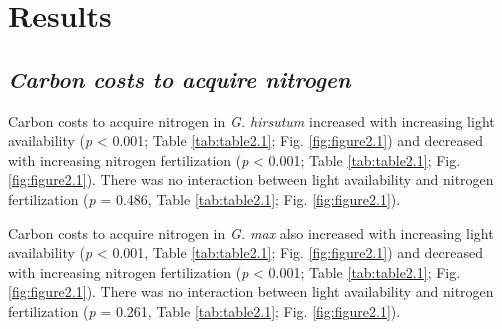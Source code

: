 \section{Results}
\subsection{\textit{Carbon costs to acquire nitrogen}}
Carbon costs to acquire nitrogen in \textit{G. hirsutum} increased with increasing light availability (\textit{p} < 0.001; Table \ref{tab:table2.1}; Fig. \ref{fig:figure2.1}) and decreased with increasing nitrogen fertilization (\textit{p} < 0.001; Table \ref{tab:table2.1}; Fig. \ref{fig:figure2.1}). There was no interaction between light availability and nitrogen fertilization (\textit{p} = 0.486, Table \ref{tab:table2.1}; Fig. \ref{fig:figure2.1}).

Carbon costs to acquire nitrogen in \textit{G. max} also increased with increasing light availability (\textit{p} < 0.001, Table \ref{tab:table2.1}; Fig. \ref{fig:figure2.1}) and decreased with increasing nitrogen fertilization (\textit{p} < 0.001; Table \ref{tab:table2.1}; Fig. \ref{fig:figure2.1}). There was no interaction between light availability and nitrogen fertilization (\textit{p} = 0.261, Table \ref{tab:table2.1}; Fig. \ref{fig:figure2.1}).

